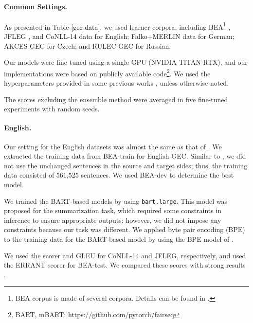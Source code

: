 \documentclass[11pt,a4paper]{article}
\begin{document}
\paragraph{Common Settings.}
As presented in Table \ref{gec-data}, we used learner corpora, including
BEA\footnote{BEA corpus is made of several corpora. Details can be found in \citet{bea2019}.} \cite{bea2019,locness,lang8-1,lang8-2,fce,nucle}, JFLEG \cite{jfleg}, and CoNLL-14 \cite{ng2014} data for English; Falko+MERLIN data \cite{merlin} for German; AKCES-GEC \cite{low_resource_gec} for Czech; and RULEC-GEC \cite{rulec} for Russian.

Our models were fine-tuned using a single GPU (NVIDIA TITAN RTX), and
 our implementations were based on publicly available code\footnote{BART, mBART: https://github.com/pytorch/fairseq}.
 We used the hyperparameters provided in some previous works \cite{bart,m-bart}, unless otherwise noted.

The scores excluding the ensemble method were averaged in five fine-tuned experiments with random seeds.

\paragraph{English.}
Our setting for the English datasets was almost the same as that of \citet{kiyono2019}.
We extracted the training data from BEA-train for English GEC.
Similar to \citet{kiyono2019}, we did not use the unchanged sentences in the source and target sides; thus, the training data consisted of 561,525 sentences.
We used BEA-dev to determine the best model.

We trained the BART-based models by using \verb|bart.large|.
This model was proposed for the summarization task, which required some constraints in inference to ensure appropriate outputs;
 however, we did not impose any constraints because our task was different.
We applied byte pair encoding (BPE) \cite{bpe} to the training data for the BART-based model by using the BPE model of \citet{bart}.

We used the  scorer \cite{m2score} and GLEU \cite{gleu} for CoNLL-14 and JFLEG, respectively, and
used the ERRANT scorer \cite{errant} for BEA-test.
We compared these scores with strong results \cite{kiyono2019,kaneko_bert}.
\end{document}
